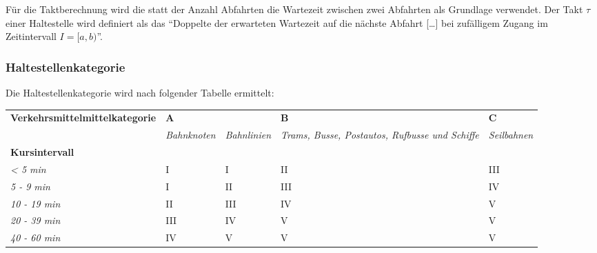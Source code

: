 Für die Taktberechnung wird die statt der Anzahl Abfahrten die Wartezeit zwischen zwei Abfahrten als Grundlage verwendet.
Der Takt $\tau$ einer Haltestelle wird definiert als das "`Doppelte der erwarteten Wartezeit auf die nächste Abfahrt [\ldots] bei zufälligem Zugang im Zeitintervall $I = [a,b)$"'.~\cite{visum_manual_formula}

\subsubsection{Haltestellenkategorie}
\label{Zusammenhang zur Berechnungsmethodik ARE:Haltestellenkategorie}

\begin{itquote}
Die Haltestellenkategorie wird nach folgender Tabelle ermittelt:
\begin{longtable}[c]{l | p{1.7cm} p{1.7cm} | p{1.7cm} | p{1.7cm}}
        \midrule
        \textbf{Verkehrsmittelmittelkategorie}
                                & \multicolumn{2}{l|}{\textbf{A}}
                                & \textbf{B}
                                & \textbf{C}\\
        \textbf{}
                                & \textit{Bahnknoten}
                                & \textit{Bahnlinien}
                                & \textit{Trams, Busse, Postautos, Rufbusse und Schiffe}
                                & \textit{Seilbahnen}\\
        \textbf{Kursintervall}
                                &
                                &
                                &
                                &\\
        \textit{< 5 min}
                                & I
                                & I
                                & II
                                & III\\
        \textit{5 - 9 min}
                                & I
                                & II
                                & III
                                & IV\\
        \textit{10 - 19 min}
                                & II
                                & III
                                & IV
                                & V\\
        \textit{20 - 39 min}
                                & III
                                & IV
                                & V
                                & V\\
        \textit{40 - 60 min}
                                & IV
                                & V
                                & V
                                & V\\
        \bottomrule
\end{longtable}
\end{itquote}

